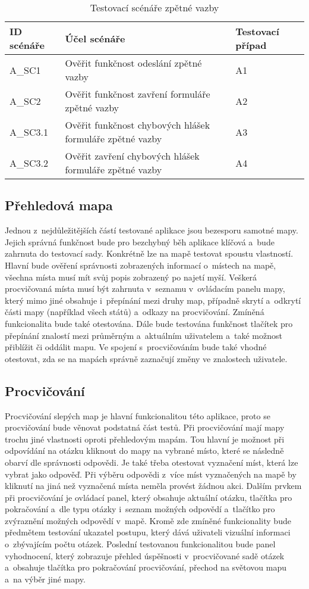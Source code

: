 \documentclass[
    color,   %
	table,   %
    twoside, %
    nolot, nolof,
]{fithesis3}
\begin{document}
\begin{table}[h]
\begin{tabular}{ | L{2cm} | L{7cm} | L{2cm}}
\hline
	ID scénáře & Účel scénáře & Testovací případ \\ \hline
	A\_SC1 & Ověřit funkčnost odeslání zpětné vazby & A1 \\ \hline
	A\_SC2 & Ověřit funkčnost zavření formuláře zpětné vazby & A2 \\ \hline
	A\_SC3.1 & Ověřit funkčnost chybových hlášek formuláře zpětné vazby & A3 \\ \hline
	A\_SC3.2 & Ověřit zavření chybových hlášek formuláře zpětné vazby & A4 \\ \hline
\end{tabular}
\caption{Testovací scénáře zpětné vazby}
\end{table}

\subsection{Přehledová mapa}
Jednou z~nejdůležitějších částí testované aplikace jsou bezesporu samotné mapy. Jejich správná funkčnost bude pro bezchybný běh aplikace klíčová a~bude zahrnuta do testovací sady. Konkrétně lze na mapě testovat spoustu vlastností. Hlavní bude ověření správnosti zobrazených informací o~místech na mapě, všechna místa musí mít svůj popis zobrazený po najetí myší. Veškerá procvičovaná místa musí být zahrnuta v~seznamu v~ovládacím panelu mapy, který mimo jiné obsahuje i~přepínání mezi druhy map, případně skrytí a~odkrytí části mapy (například všech států) a~odkazy na procvičování. Zmíněná funkcionalita bude také otestována. Dále bude testována funkčnost tlačítek pro přepínání znalostí mezi průměrným a~aktuálním uživatelem a~také možnost přiblížit či oddálit mapu. Ve spojení s~procvičováním bude také vhodné otestovat, zda se na mapách správně zaznačují změny ve znalostech uživatele.

\subsection{Procvičování}
Procvičování slepých map je hlavní funkcionalitou této aplikace, proto se procvičování bude věnovat podstatná část testů. Při procvičování mají mapy trochu jiné vlastnosti oproti přehledovým mapám. Tou hlavní je možnost při odpovídání na otázku kliknout do mapy na vybrané místo, které se následně obarví dle správnosti odpovědi. Je také třeba otestovat vyznačení míst, která lze vybrat jako odpověď. Při výběru odpovědi z~více míst vyznačených na mapě by kliknutí na jiná než vyznačená místa neměla provést žádnou akci. Dalším prvkem při procvičování je ovládací panel, který obsahuje aktuální otázku, tlačítka pro pokračování a~dle typu otázky i~seznam možných odpovědí a~tlačítko pro zvýraznění možných odpovědí v~mapě. Kromě zde zmíněné funkcionality bude předmětem testování ukazatel postupu, který dává uživateli vizuální informaci o~zbývajícím počtu otázek. Poslední testovanou funkcionalitou bude panel vyhodnocení, který zobrazuje přehled úspěšnosti v~procvičované sadě otázek a~obsahuje tlačítka pro pokračování procvičování, přechod na světovou mapu a~na výběr jiné mapy.
\end{document}
